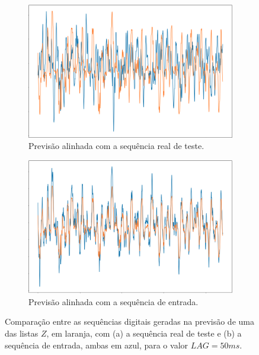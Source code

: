 \begin{figure}
     \centering
     \begin{subfigure}[b]{0.49\textwidth}
         \centering
         \includegraphics[width=\textwidth]{images/lstm-after.png}
         \caption{Previsão alinhada com a sequência real de teste.}
         \label{fig:y equals x}
     \end{subfigure}
     \hfill
     \begin{subfigure}[b]{0.49\textwidth}
         \centering
         \includegraphics[width=\textwidth]{images/lstm-before.png}
         \caption{Previsão alinhada com a sequência de entrada.}
         \label{fig:three sin x}
     \end{subfigure}
        \caption{Comparação entre as sequências digitais geradas na previsão de uma das listas $Z$, em laranja, com (a) a sequência real de teste e (b) a sequência de entrada, ambas em azul, para o valor $LAG = 50 ms$.}
        \label{fig:lstm-repetition-results}
\end{figure}


